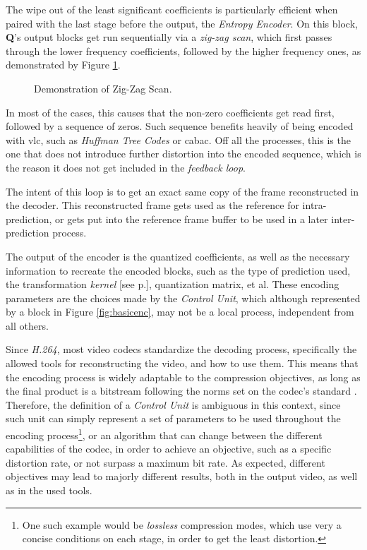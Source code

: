 The wipe out of the least significant coefficients is particularly efficient when paired with the last stage before the output, the \emph{Entropy Encoder}. On this block, \textbf{Q}'s output blocks get run sequentially via a \emph{zig-zag scan}, which first passes through the lower frequency coefficients, followed by the higher frequency ones, as demonstrated by Figure \ref{fig:zigzag}.

\begin{figure}[!htbp]
    \centering
    
    \caption{Demonstration of Zig-Zag Scan.}
    \label{fig:zigzag}
\end{figure}

In most of the cases, this causes that the non-zero coefficients get read first, followed by a sequence of zeros. Such sequence benefits heavily of being encoded with \gls{vlc}, such as \emph{Huffman Tree Codes} or \Gls{cabac}. Off all the processes, this is the one that does not introduce further distortion into the encoded sequence, which is the reason it does not get included in the \emph{feedback loop}.

The intent of this loop is to get an exact same copy of the frame reconstructed in the decoder. This reconstructed frame gets used as the reference for intra-prediction, or gets put into the reference frame buffer to be used in a later inter-prediction process. 

The output of the encoder is the quantized coefficients, as well as the necessary information to recreate the encoded blocks, such as the type of prediction used, the transformation \emph{kernel} [see p.\pageref{par:kernel}], quantization matrix, et al. These encoding parameters are the choices made by the \emph{Control Unit}, which although represented by a block in Figure \ref{fig:basicenc}, may not be a local process, independent from all others. 

Since \emph{H.264}, most video codecs standardize the decoding process, specifically the allowed tools for reconstructing the video, and how to use them. This means that the encoding process is widely adaptable to the compression objectives, as long as the final product is a bitstream following the norms set on the codec's standard \cite{AV1BitstreamDecoding}. Therefore, the definition of a \emph{Control Unit} is ambiguous in this context, since such unit can simply represent a set of parameters to be used throughout the encoding process\footnote{One such example would be \emph{lossless} compression modes, which use very a concise conditions on each stage, in order to get the least distortion.}, or an algorithm that can change between the different capabilities of the codec, in order to achieve an objective, such as a specific distortion rate, or not surpass a maximum bit rate. As expected, different objectives may lead to majorly different results, both in the output video, as well as in the used tools.

